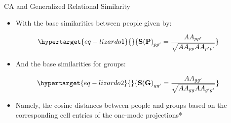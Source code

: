 \documentclass[
  ignorenonframetext,
]{beamer}
\providecommand{\tightlist}{%
  \setlength{\itemsep}{0pt}\setlength{\parskip}{0pt}}\usepackage{longtable,booktabs,array}
\begin{document}
\begin{frame}{CA and Generalized Relational Similarity}
\protect\hypertarget{ca-and-generalized-relational-similarity-2}{}
\begin{itemize}
\tightlist
\item
  With the base similarities between people given by:
\end{itemize}

\begin{equation}\protect\hypertarget{eq-lizardo1}{}{
\mathbf{S(P)}_{pp'} = \frac{AA_{pp'}}{\sqrt{AA_{pp}AA_{p'p'}}}
}\label{eq-lizardo1}\end{equation}

\begin{itemize}
\tightlist
\item
  And the base similarities for groups:
\end{itemize}

\begin{equation}\protect\hypertarget{eq-lizardo2}{}{
\mathbf{S(G)}_{gg'} = \frac{AA_{gg'}}{\sqrt{AA_{gg}AA_{g'g'}}}
}\label{eq-lizardo2}\end{equation}

\begin{itemize}
\tightlist
\item
  Namely, the cosine distances between people and groups based on the
  corresponding cell entries of the one-mode projections*
\end{itemize}

\end{frame}
\end{document}
